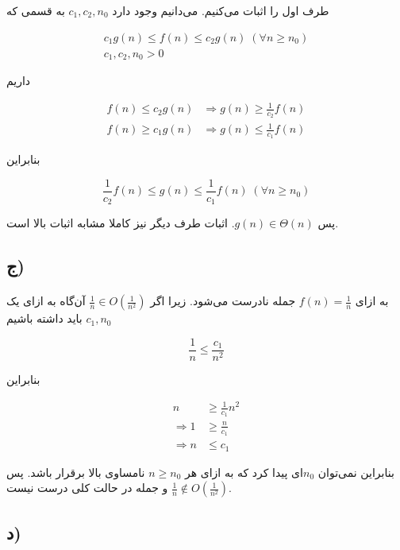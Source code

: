\documentclass{article}
\begin{document}
	طرف اول را اثبات می‌کنیم. می‌دانیم وجود دارد
	$c_1, c_2, n_0$
	به قسمی که

	\begin{gather*}
		c_1g(n) \le f(n) \le c_2g(n) \; (\forall n \ge n_0) \\
		c_1, c_2, n_0 > 0
	\end{gather*}

	داریم

	\begin{align*}
		f(n) \le c_2g(n) &\Rightarrow g(n) \ge \frac{1}{c_2}f(n) \\
		f(n) \ge c_1g(n) &\Rightarrow g(n) \le \frac{1}{c_1}f(n)
	\end{align*}

	بنابراین

	\begin{equation*}
		\frac{1}{c_2}f(n) \le g(n) \le \frac{1}{c_1}f(n) \; (\forall n \ge n_0)
	\end{equation*}

	پس
	$g(n) \in \Theta(n)$.
	اثبات طرف دیگر نیز کاملا مشابه اثبات بالا است.

	\subsection*{ج)}
	\paragraph*{}
	به ازای
	$f(n) = \frac{1}{n}$
	جمله نادرست می‌شود. زیرا اگر
	$\frac{1}{n} \in O(\frac{1}{n^2})$
	آن‌گاه به ازای یک
	$c_1, n_0$
	باید داشته باشیم

	\begin{equation*}
		\frac{1}{n} \le \frac{c_1}{n^2}
	\end{equation*}

	بنابراین

	\begin{align*}
		n &\ge \frac{1}{c_1}n^2 \\
		\Rightarrow
		1 &\ge \frac{n}{c_1} \\
		\Rightarrow
		n &\le c_1
	\end{align*}

	بنابراین نمی‌توان
	$n_0$ای
	پیدا کرد که به ازای هر
	$n \ge n_0$
	نامساوی بالا برقرار باشد. پس
	$\frac{1}{n} \notin O(\frac{1}{n^2})$
	و جمله در حالت کلی درست نیست.

	\subsection*{د)}
\end{document}
